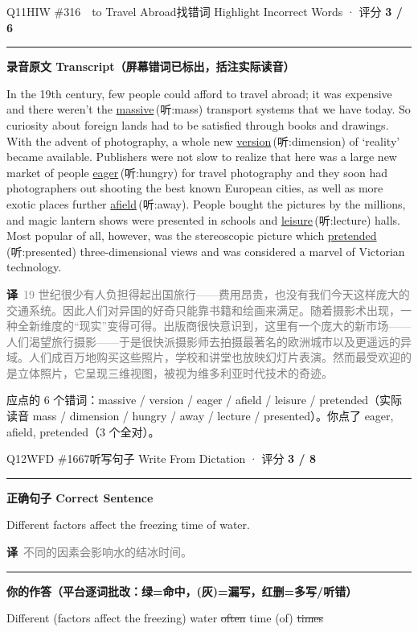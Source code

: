 \documentclass[11pt]{article}
\newcommand{\ptesub}[1]{%
  \par\needspace{2\baselineskip}\smallskip
  {\color{cAccent}\rule[-0.2ex]{3pt}{1.05em}}\hspace{6pt}%
  {\bfseries\color{cHead}#1}\par\nopagebreak\smallskip}
\newcommand{\zh}[1]{{\footnotesize\textcolor{cNote}{\textbf{译}}\ \textcolor{gray}{#1}}}
\newcommand{\hiw}[2]{{\color{cWrong}\uline{#1}}\,{\footnotesize\color{cFix}(听:#2)}} %
\newcommand{\lhit}[1]{{\color{cFix}#1}}                           %
\newcommand{\lmiss}[1]{{\color{cWrong}\sout{#1}}}                 %
\begin{document}
\begin{qblock}{Q11\quad HIW \#316\ \ to Travel Abroad}{找错词 Highlight Incorrect Words · 评分 \textcolor{cAccent}{\bfseries 3 / 6}}
\ptesub{录音原文 Transcript（屏幕错词已标出，括注实际读音）}
\begin{promptbox}
In the 19th century, few people could afford to travel abroad; it was expensive and there weren't the \hiw{massive}{mass} transport systems that we have today. So curiosity about foreign lands had to be satisfied through books and drawings. With the advent of photography, a whole new \hiw{version}{dimension} of `reality' became available. Publishers were not slow to realize that here was a large new market of people \hiw{eager}{hungry} for travel photography and they soon had photographers out shooting the best known European cities, as well as more exotic places further \hiw{afield}{away}. People bought the pictures by the millions, and magic lantern shows were presented in schools and \hiw{leisure}{lecture} halls. Most popular of all, however, was the stereoscopic picture which \hiw{pretended}{presented} three-dimensional views and was considered a marvel of Victorian technology.
\end{promptbox}
\zh{19 世纪很少有人负担得起出国旅行——费用昂贵，也没有我们今天这样庞大的交通系统。因此人们对异国的好奇只能靠书籍和绘画来满足。随着摄影术出现，一种全新维度的“现实”变得可得。出版商很快意识到，这里有一个庞大的新市场——人们渴望旅行摄影——于是很快派摄影师去拍摄最著名的欧洲城市以及更遥远的异域。人们成百万地购买这些照片，学校和讲堂也放映幻灯片表演。然而最受欢迎的是立体照片，它呈现三维视图，被视为维多利亚时代技术的奇迹。}
\par{\small 应点的 6 个错词：{\color{cWrong}massive / version / eager / afield / leisure / pretended}\quad（实际读音 mass / dimension / hungry / away / lecture / presented）。\;你点了 {\color{cFix}eager, afield, pretended}（3 个全对）。}
\end{qblock}

\begin{qblock}{Q12\quad WFD \#1667}{听写句子 Write From Dictation · 评分 \textcolor{cAccent}{\bfseries 3 / 8}}
\ptesub{正确句子 Correct Sentence}
\begin{promptbox}
Different factors affect the freezing time of water.
\end{promptbox}
\zh{不同的因素会影响水的结冰时间。}
\ptesub{你的作答（平台逐词批改：{\color{cFix}绿=命中}，{\color{gray}(灰)=漏写}，{\color{cWrong}红删=多写/听错}）}
{\small\lhit{Different} {\color{gray}(factors affect the freezing)} \lhit{water} \lmiss{often} \lhit{time} {\color{gray}(of)} \lmiss{times}}
\end{qblock}
\end{document}
